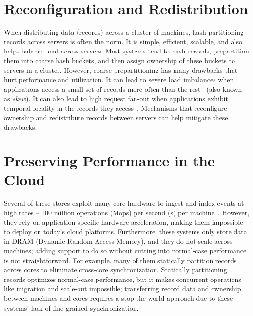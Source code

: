 \section{Reconfiguration and Redistribution}

When distributing data (records) across a cluster of
machines, hash partitioning records across
servers is often the norm.
%
It is simple, efficient, scalable, and also helps balance load
across servers.
%
Most systems tend to hash records, prepartition them into coarse hash
buckets, and then assign ownership of these buckets to servers in a
cluster.
%
However, coarse prepartitioning has many drawbacks that hurt
performance and utilization.
%
It can lead to severe load imbalances when applications access a small
set of records more often than the rest~\cite{slicer} (also known as
\emph{skew}).
%
It can also lead to high request fan-out when
applications exhibit temporal locality in the records they
access~\cite{rocksteady}.
%
Mechanisms that reconfigure ownership and
redistribute records between servers can help mitigate these drawbacks.

%
%

\section{Preserving Performance in the Cloud}

Several of these stores exploit many-core hardware to
ingest and index events at high rates -- 100 million operations
(Mops) per second (s) per machine~\cite{mica,flexnic,floem,kvdirect}.
%
However, they rely on application-specific
hardware acceleration, making them impossible to deploy on today's cloud
platforms.
%
Furthermore, these systems only store data in DRAM (Dynamic Random
Access Memory), and they do not scale across
machines; adding support to do so without cutting into normal-case performance
is not straightforward.
%
For example, many of them statically partition records across cores to
eliminate cross-core synchronization.
%
Statically partitioning records optimizes normal-case performance, but
it makes concurrent
operations like migration and scale-out impossible; transferring record data
and ownership between machines and cores requires a stop-the-world approach
due to these systems' lack of fine-grained synchronization.

